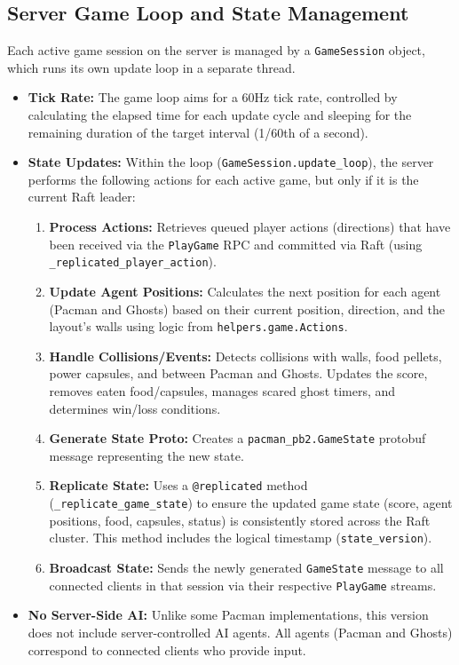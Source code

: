 \documentclass[11pt]{article}
\begin{document}
\subsection{Server Game Loop and State Management}
Each active game session on the server is managed by a \texttt{GameSession} object, which runs its own update loop in a separate thread.
\begin{itemize}
    \item \textbf{Tick Rate:} The game loop aims for a 60Hz tick rate, controlled by calculating the elapsed time for each update cycle and sleeping for the remaining duration of the target interval (1/60th of a second).
    \item \textbf{State Updates:} Within the loop (\texttt{GameSession.update\_loop}), the server performs the following actions for each active game, but only if it is the current Raft leader:
    \begin{enumerate}
        \item \textbf{Process Actions:} Retrieves queued player actions (directions) that have been received via the \texttt{PlayGame} RPC and committed via Raft (using \texttt{\_replicated\_player\_action}).
        \item \textbf{Update Agent Positions:} Calculates the next position for each agent (Pacman and Ghosts) based on their current position, direction, and the layout's walls using logic from \texttt{helpers.game.Actions}.
        \item \textbf{Handle Collisions/Events:} Detects collisions with walls, food pellets, power capsules, and between Pacman and Ghosts. Updates the score, removes eaten food/capsules, manages scared ghost timers, and determines win/loss conditions.
        \item \textbf{Generate State Proto:} Creates a \texttt{pacman\_pb2.GameState} protobuf message representing the new state.
        \item \textbf{Replicate State:} Uses a \texttt{@replicated} method (\texttt{\_replicate\_game\_state}) to ensure the updated game state (score, agent positions, food, capsules, status) is consistently stored across the Raft cluster. This method includes the logical timestamp (\texttt{state\_version}).
        \item \textbf{Broadcast State:} Sends the newly generated \texttt{GameState} message to all connected clients in that session via their respective \texttt{PlayGame} streams.
    \end{enumerate}
    \item \textbf{No Server-Side AI:} Unlike some Pacman implementations, this version does not include server-controlled AI agents. All agents (Pacman and Ghosts) correspond to connected clients who provide input.
\end{itemize}
\end{document}
